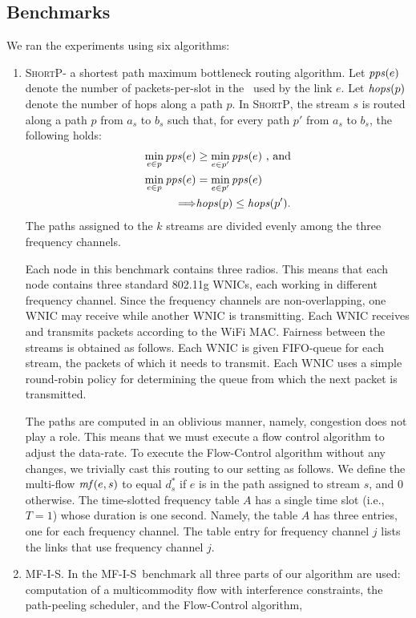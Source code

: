 \documentclass[12pt]{article}
\newenvironment{proof sketch}[1]{\noindent {\emph{Proof sketch of #1:}}}{\hfill \qed}
\newcommand{\pps}{\text{\emph{pps}}}
\newcommand{\hops}{\text{\emph{hops}}}
\newcommand{\mf}{\text{\emph{mf}}}
\newcommand{\MCS}{\text{\sc{mcs}}}
\newcommand{\algA}{\textsc{MF-I-S}}
\newcommand{\algB}{\textsc{ShortP}}
\newcommand{\algS}{\algB}
\begin{document}
\subsection{Benchmarks}\label{sec:bench}
We ran the experiments using six algorithms:
\begin{enumerate}
\item \algS - a shortest path maximum bottleneck routing algorithm.
  Let $\pps(e)$ denote the number of packets-per-slot in the
  \MCS\ used by the link $e$.  Let $\hops(p)$ denote the number of
  hops along a path $p$. In \algS, the stream $s$ is routed along a
  path $p$ from $a_s$ to $b_s$ such that, for every path $p'$ from
  $a_s$ to $b_s$, the following holds:
  \begin{align*}
    \min_{e \in p} \pps(e) &\geq \min_{e \in p'} \pps(e) \text{ , and}\\
    \min_{e \in p} \pps(e) &= \min_{e \in p'} \pps(e)  \\
\Longrightarrow &\hops(p) \leq \hops(p').
  \end{align*}
  The paths assigned to the $k$ streams are divided evenly among the
  three frequency channels.

Each node in this benchmark contains three
  radios. This means that each node contains three standard 802.11g
  WNICs, each working in different frequency channel.  Since the
  frequency channels are non-overlapping, one WNIC may receive while
  another WNIC is transmitting.  Each WNIC receives and transmits
  packets according to the WiFi MAC.  Fairness between the streams is
  obtained as follows.  Each WNIC is given FIFO-queue for each stream,
  the packets of which it needs to transmit. Each WNIC uses a simple
  round-robin policy for determining the queue from which the next
  packet is transmitted.

  The paths are computed in an oblivious manner, namely, congestion
  does not play a role. This means that we must execute a flow control
  algorithm to adjust the data-rate.  To execute the Flow-Control
  algorithm without any changes, we trivially cast this routing to our
  setting as follows.  We define the multi-flow $\mf(e,s)$ to equal
  $d^*_s$ if $e$ is in the path assigned to stream $s$, and $0$
  otherwise. The time-slotted frequency table $A$ has a single time
  slot (i.e., $T=1$) whose duration is one second. Namely, the table
  $A$ has three entries, one for each frequency channel.  The table
  entry for frequency channel $j$ lists the links that use frequency
  channel $j$.
\item \algA. In the \algA\ benchmark all three parts of our algorithm
  are used: computation of a multicommodity flow with interference
  constraints, the path-peeling scheduler, and the Flow-Control
  algorithm,


\end{enumerate}
\end{document}
